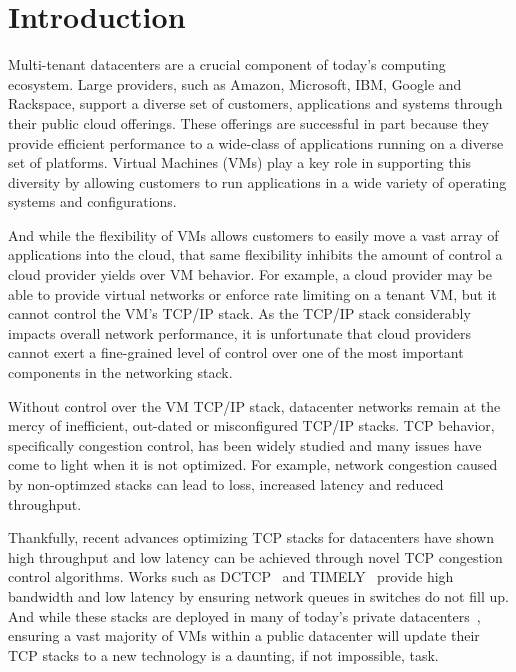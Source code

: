 \section{Introduction}
\label{intro}

Multi-tenant datacenters are a crucial component of today's computing ecosystem. Large providers, such as Amazon, Microsoft, IBM, Google and Rackspace, support
a diverse set of customers, applications and systems through their public cloud offerings. These offerings are successful in 
part because they provide efficient performance to a wide-class of applications running on a diverse set of platforms. Virtual
Machines (VMs) play a key role in supporting this diversity by allowing customers to run applications in a wide variety of 
operating systems and configurations.

And while the flexibility of VMs allows customers to easily move a vast array of applications into the cloud, that same flexibility inhibits the 
amount of control a cloud provider yields over VM behavior. For example, a cloud provider may be able to provide virtual networks or enforce rate limiting
on a tenant VM, but it cannot control the VM's TCP/IP stack. As the TCP/IP stack considerably impacts overall network performance, it 
is unfortunate that cloud providers cannot exert a fine-grained level of control over one of the most important components in the networking stack.

Without control over the VM TCP/IP stack, datacenter networks remain at the mercy of inefficient, out-dated or misconfigured TCP/IP stacks.
TCP behavior, specifically congestion control, has been widely studied and many issues have come to light when it is not optimized. For example,
network congestion caused by non-optimzed stacks can lead to loss, increased latency and reduced throughput. 

Thankfully, recent advances optimizing TCP stacks for datacenters have shown high throughput and low latency can be 
achieved through novel TCP congestion control algorithms. Works such as DCTCP~\cite{alizadeh2011data} and TIMELY~\cite{mittal2015timely} provide high
bandwidth and low latency by ensuring network queues in switches do not fill up. And while these stacks are deployed in many of today's 
private datacenters~\cite{singh2015jupiter,judd2015nsdi}, ensuring a vast majority of VMs within a public datacenter will update their TCP stacks
to a new technology is a daunting, if not impossible, task.

